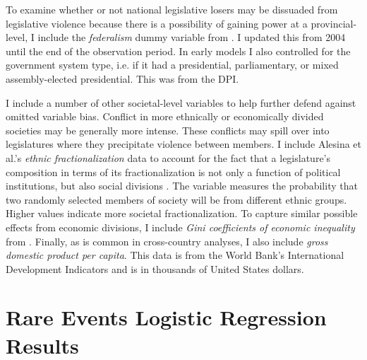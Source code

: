 \documentclass[a4paper]{article}\usepackage[]{graphicx}\usepackage[]{color}
\begin{document}
To examine whether or not national legislative losers may be dissuaded from legislative violence because there is a possibility of gaining power at a provincial-level, I include the \emph{federalism} dummy variable from \cite{Carey2011}. I updated this from 2004 until the end of the observation period. In early models I also controlled for the government system type, i.e. if it had a presidential, parliamentary, or mixed assembly-elected presidential. This was from the DPI.

I include a number of other societal-level variables to help further defend against omitted variable bias. Conflict in more ethnically or economically divided societies may be generally more intense. These conflicts may spill over into legislatures where they precipitate violence between members. I include Alesina et al.'s \citeyearpar{Alesina2003} {\emph{ethnic fractionalization}} data to account for the fact that a legislature's composition in terms of its fractionalization is not only a function of political institutions, but also social divisions \citep{Neto1997, Mozaffar2003}. The variable measures the probability that two randomly selected members of society will be from different ethnic groups. Higher values indicate more societal fractionalization. To capture similar possible effects from economic divisions, I include {\emph{Gini coefficients of economic inequality}} from \cite{UNU2008}. Finally, as is common in cross-country analyses, I also include {\emph{gross domestic product per capita}}. This data is from the World Bank's International Development Indicators \citeyearpar{WorldBank2011} and is in thousands of United States dollars.



\section{Rare Events Logistic Regression Results}
\end{document}
